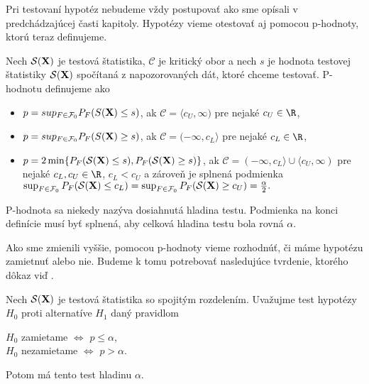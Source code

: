 Pri testovaní hypotéz nebudeme vždy postupovať ako sme opísali v predchádzajúcej časti kapitoly. 
Hypotézy vieme otestovať aj pomocou p-hodnoty, ktorú teraz definujeme. 

\begin{definicia}\label{def4}
  Nech $\mathcal{S}(\bf{X})$ je testová štatistika, $\mathcal{C}$ je kritický obor a nech $s$ je hodnota testovej štatistiky $\mathcal{S}(\bf{X})$ 
  spočítaná z napozorovaných dát, ktoré chceme testovať. 
  P-hodnotu definujeme ako 
  \begin{itemize} 
    \item $ p = sup_{F \in \mathcal{F}_0} P_F (S({\bf X}) \leq s) $, 
    ak $\mathcal{C} = \langle c_U, \infty)$ pre nejaké $c_U \in \R$,
    \item $ p = sup_{F \in \mathcal{F}_0} P_F (S({\bf X}) \geq s) $, 
    ak $\mathcal{C} = (-\infty, c_L \rangle$ pre nejaké $c_L \in \R$,
    \item $ p = 2 \min \{P_F (\mathcal{S}({\bf X}) \leq s), P_F (\mathcal{S}({\bf X}) \geq s)\} $, 
    ak $\mathcal{C} = (-\infty, c_L \rangle \cup \langle c_U, \infty)$  
    pre nejaké $c_L, c_U \in \R$, $c_L < c_U$ a zároveň je splnená podmienka 
    \newline $ \sup_{F \in \mathcal{F}_0} P_F (\mathcal{S}({\bf X}) \leq c_L) 
    = \sup_{F \in \mathcal{F}_0} P_F (\mathcal{S}({\bf X}) \geq c_U) = \frac{\alpha}{2}. $
  \end{itemize}
\end{definicia}  

P-hodnota sa niekedy nazýva dosiahnutá hladina testu. 
Podmienka na konci definície musí byť splnená, aby celková hladina testu bola rovná $\alpha$. 

Ako sme zmienili vyššie, pomocou p-hodnoty vieme rozhodnúť, či máme hypotézu zamietnuť alebo nie. 
Budeme k tomu potrebovať nasledujúce tvrdenie, ktorého dôkaz viď \cite[Omelka, Tvrdenie 4.1]{Omelka18}. 

\begin{tvrd}\label{tvrd01}
  Nech $\mathcal{S}({\bf X})$ je testová štatistika so spojitým rozdelením. 
  Uvažujme test hypotézy $H_0$ proti alternatíve $H_1$ daný pravidlom 
  \begin{center}
    $H_0$ zamietame $\Longleftrightarrow$ $p \leq \alpha$, \\
    $H_0$ nezamietame $\Longleftrightarrow$ $p > \alpha$.\\
  \end{center}  
  Potom má tento test hladinu $\alpha$. 
\end{tvrd}  

